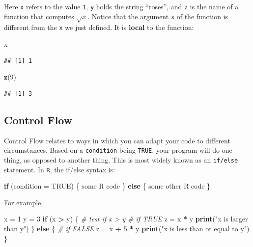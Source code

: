 \documentclass[]{book}
\newenvironment{Shaded}{\begin{snugshade}}{\end{snugshade}}
\newcommand{\KeywordTok}[1]{\textcolor[rgb]{0.13,0.29,0.53}{\textbf{#1}}}
\newcommand{\DataTypeTok}[1]{\textcolor[rgb]{0.13,0.29,0.53}{#1}}
\newcommand{\DecValTok}[1]{\textcolor[rgb]{0.00,0.00,0.81}{#1}}
\newcommand{\StringTok}[1]{\textcolor[rgb]{0.31,0.60,0.02}{#1}}
\newcommand{\CommentTok}[1]{\textcolor[rgb]{0.56,0.35,0.01}{\textit{#1}}}
\newcommand{\OtherTok}[1]{\textcolor[rgb]{0.56,0.35,0.01}{#1}}
\newcommand{\ControlFlowTok}[1]{\textcolor[rgb]{0.13,0.29,0.53}{\textbf{#1}}}
\newcommand{\OperatorTok}[1]{\textcolor[rgb]{0.81,0.36,0.00}{\textbf{#1}}}
\newcommand{\NormalTok}[1]{#1}
\begin{document}
Here \texttt{x} refers to the value \texttt{1}, \texttt{y} holds the
string ``roses'', and \texttt{z} is the name of a function that computes
\(\sqrt{x}\). Notice that the argument \texttt{x} of the function is
different from the \texttt{x} we just defined. It is \textbf{local} to
the function:

\begin{Shaded}
\begin{Highlighting}[]
\NormalTok{x}
\end{Highlighting}
\end{Shaded}

\begin{verbatim}
## [1] 1
\end{verbatim}

\begin{Shaded}
\begin{Highlighting}[]
\KeywordTok{z}\NormalTok{(}\DecValTok{9}\NormalTok{)}
\end{Highlighting}
\end{Shaded}

\begin{verbatim}
## [1] 3
\end{verbatim}

\subsection{Control Flow}\label{control-flow}

Control Flow relates to ways in which you can adapt your code to
different circumstances. Based on a \texttt{condition} being
\texttt{TRUE}, your program will do one thing, as opposed to another
thing. This is most widely known as an \texttt{if/else} statement. In
\texttt{R}, the if/else syntax is:

\begin{Shaded}
\begin{Highlighting}[]
\ControlFlowTok{if}\NormalTok{ (}\DataTypeTok{condition =} \OtherTok{TRUE}\NormalTok{) \{}
\NormalTok{  some R code}
\NormalTok{\} }\ControlFlowTok{else}\NormalTok{ \{}
\NormalTok{  some other R code}
\NormalTok{\}}
\end{Highlighting}
\end{Shaded}

For example,

\begin{Shaded}
\begin{Highlighting}[]
\NormalTok{x =}\StringTok{ }\DecValTok{1}
\NormalTok{y =}\StringTok{ }\DecValTok{3}
\ControlFlowTok{if}\NormalTok{ (x }\OperatorTok{>}\StringTok{ }\NormalTok{y) \{  }\CommentTok{# test if x > y}
  \CommentTok{# if TRUE}
\NormalTok{  z =}\StringTok{ }\NormalTok{x }\OperatorTok{*}\StringTok{ }\NormalTok{y}
  \KeywordTok{print}\NormalTok{(}\StringTok{"x is larger than y"}\NormalTok{)}
\NormalTok{\} }\ControlFlowTok{else}\NormalTok{ \{}
  \CommentTok{# if FALSE}
\NormalTok{  z =}\StringTok{ }\NormalTok{x }\OperatorTok{+}\StringTok{ }\DecValTok{5} \OperatorTok{*}\StringTok{ }\NormalTok{y}
  \KeywordTok{print}\NormalTok{(}\StringTok{"x is less than or equal to y"}\NormalTok{)}
\NormalTok{\}}
\end{Highlighting}
\end{Shaded}
\end{document}

